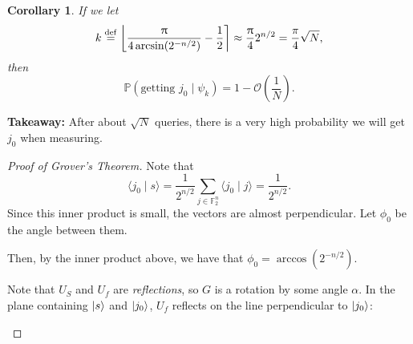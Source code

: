 \documentclass[12pt]{amsart}
\theoremstyle{plain}
\newtheorem{corollary}[theorem]{Corollary}
\theoremstyle{definition}
\theoremstyle{remarks}
\newcommand{\mcal}{\mathcal}
\newcommand{\F}{\mathbb{F}}
\newcommand{\mpi}{\uppi}
\newcommand{\idef}{\overset{{\rm def}}{=}}
\newcommand{\prob}{\mathbb{P}}
\begin{document}
\begin{corollary}
  If we let
  \[
    k \idef \left\lfloor \frac{\mpi}{4 \arcsin(2^{-n/2})} - \frac{1}{2} \right\rceil \approx \frac{\mpi}{4} 2^{n/2} = \frac{\pi}{4} \sqrt{N},
  \]
  then
  \[
    \prob(\text{getting $j_0$} \mid \psi_k) = 1 - \mcal{O}\left( \frac{1}{N} \right).
  \]
\end{corollary}

\textbf{Takeaway:}  After about $\sqrt{N}$ queries, there is a very high probability we will get $j_0$ when measuring.

\begin{proof}[Proof of Grover's Theorem]
  Note that
  \[
    \langle j_0 \mid s \rangle = \frac{1}{2^{n/2}} \sum_{j \in \F_2^n} \langle j_0 \mid j \rangle = \frac{1}{2^{n/2}}.
  \]
  Since this inner product is small, the vectors are almost perpendicular.  Let $\phi_0$ be the angle between them.

  \begin{center}
  \end{center}
  Then, by the inner product above, we have that $\phi_0 = \arccos(2^{-n/2})$.


  Note that $U_S$ and $U_f$ are \emph{reflections}, so $G$ is a rotation by some angle  $\alpha$.  In the plane containing $\ket{s}$ and $\ket{j_0}$, $U_f$ reflects on the line perpendicular to $\ket{j_0}$:

  \begin{center}
\end{center}
\end{proof}
\end{document}
